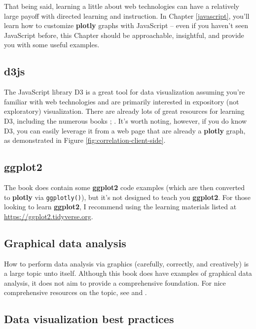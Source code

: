 \documentclass[
  12pt,
]{krantz}
\begin{document}
That being said, learning a little about web technologies can have a relatively large payoff with directed learning and instruction. In Chapter \ref{javascript}, you'll learn how to customize \textbf{plotly} graphs with JavaScript -- even if you haven't seen JavaScript before, this Chapter should be approachable, insightful, and provide you with some useful examples.

\hypertarget{d3js}{%
\subsection{d3js}\label{d3js}}

The JavaScript library D3 is a great tool for data visualization assuming you're familiar with web technologies and are primarily interested in expository (not exploratory) visualization. There are already lots of great resources for learning D3, including the numerous books \citep{murray-d3}; \citep{meeks-d3}. It's worth noting, however, if you do know D3, you can easily leverage it from a web page that are already a \textbf{plotly} graph, as demonstrated in Figure \ref{fig:correlation-client-side}.

\hypertarget{ggplot2}{%
\subsection{ggplot2}\label{ggplot2}}

The book does contain some \textbf{ggplot2} code examples (which are then converted to \textbf{plotly} via \texttt{ggplotly()}), but it's not designed to teach you \textbf{ggplot2}. For those looking to learn \textbf{ggplot2}, I recommend using the learning materials listed at \url{https://ggplot2.tidyverse.org}.

\hypertarget{graphical-data-analysis}{%
\subsection{Graphical data analysis}\label{graphical-data-analysis}}

How to perform data analysis via graphics (carefully, correctly, and creatively) is a large topic unto itself. Although this book does have examples of graphical data analysis, it does not aim to provide a comprehensive foundation. For nice comprehensive resources on the topic, see \citep{unwin-graphical-analysis} and \citep{ggobi:2007}.

\hypertarget{data-visualization-best-practices}{%
\subsection{Data visualization best practices}\label{data-visualization-best-practices}}
\end{document}
